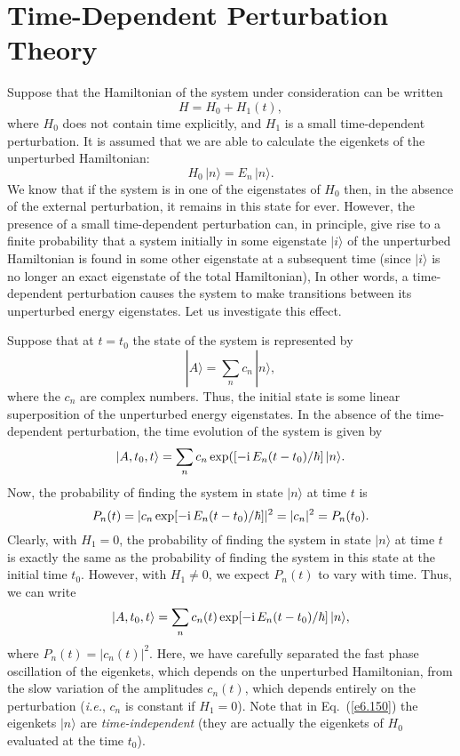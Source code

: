 \section{Time-Dependent Perturbation Theory}
Suppose that the Hamiltonian of the  system under consideration 
can be written
\begin{equation}
H = H_0 + H_1(t),
\end{equation}
where $H_0$ does not contain time explicitly, and $H_1$ is a small
time-dependent perturbation. It is assumed that we are able to calculate
the eigenkets of the unperturbed Hamiltonian:
\begin{equation}
H_0 \,|n\rangle = E_n \,|n\rangle.
\end{equation}
We know that if the system is in one of the
eigenstates of $H_0$ then, in the absence of the external
perturbation,  it remains in this state for ever. However,
the presence of a small time-dependent perturbation can, in principle, 
give rise to a finite probability that a system initially in some
eigenstate $|i\rangle$ of the unperturbed Hamiltonian
is  found in some other eigenstate at a subsequent time (since
$|i\rangle$ is no longer  an exact  eigenstate of the total
 Hamiltonian),
 In other words,
a time-dependent perturbation  causes
the system to make transitions between
its unperturbed energy eigenstates. Let us investigate this effect. 

Suppose that at $t=t_0$ the state of the system is represented by
\begin{equation}
|A\rangle = \sum_n c_n\, |n\rangle,
\end{equation}
where the $c_n$ are complex numbers. Thus, the initial state is some
linear superposition of the unperturbed 
energy eigenstates. In the absence of the
time-dependent perturbation, the time evolution of the system is
given by
\begin{equation}
|A, t_0, t\rangle = \sum_n c_n \exp([-{\rm i}\,E_n (t-t_0)/\hbar]\,|n\rangle.
\end{equation}
Now, the probability of finding the system in state $|n\rangle$ at time
$t$ is 
\begin{equation}
P_n(t) = |c_n \exp[-{\rm i}\,E_n (t-t_0)/\hbar]|^2 = |c_n|^2 = P_n(t_0).
\end{equation}
Clearly, with $H_1= 0$, the probability of finding the system in
state $|n\rangle$ at time $t$ is exactly the same as the probability
of finding the system in this state at the initial time $t_0$. However,
with $H_1\neq 0$, we expect $P_n(t)$ to vary with time. Thus, we can
write
\begin{equation}\label{e6.150}
|A, t_0, t\rangle = \sum_n c_n(t) \exp[-{\rm i}\,E_n (t-t_0)/\hbar]\,|n\rangle,
\end{equation}
where $P_n(t) = |c_n(t)|^2$. Here, we have carefully separated the fast 
phase oscillation of the eigenkets, which depends on the unperturbed
Hamiltonian, from the slow variation of the amplitudes $c_n(t)$, which
depends entirely on the perturbation ({\em i.e.}, $c_n$ is constant if $H_1=0$).
Note that in Eq.~(\ref{e6.150}) the eigenkets $|n\rangle$ are {\em time-independent}
(they are actually the eigenkets of $H_0$ evaluated at the time $t_0$).

